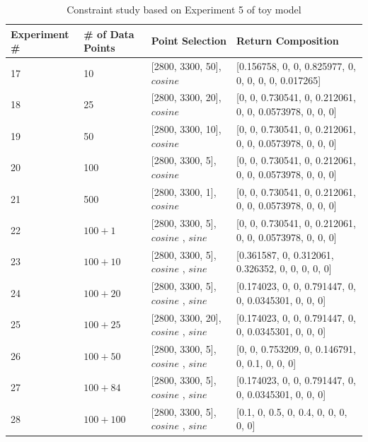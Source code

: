 \begin{table} \tiny 
\begin{center}
\begin{tabular}{| p{2cm} | p{2cm} | p{4cm}  | l |}
\hline
Experiment \# & \# of Data Points & Point Selection & Return Composition \\ \hline
17 & 10 & [2800, 3300, 50], $cosine$ & [0.156758, 0, 0, 0.825977, 0, 0, 0, 0, 0, 0.017265] \\ \hline
18 & 25 & [2800, 3300, 20], $cosine$ & [0, 0, 0.730541, 0, 0.212061, 0, 0, 0.0573978, 0, 0, 0] \\ \hline
19 & 50 & [2800, 3300, 10], $cosine$ & [0, 0, 0.730541, 0, 0.212061, 0, 0, 0.0573978, 0, 0, 0] \\ \hline
20 & 100 & [2800, 3300, 5], $cosine$ & [0, 0, 0.730541, 0, 0.212061, 0, 0, 0.0573978, 0, 0, 0] \\ \hline
21 & 500 & [2800, 3300, 1], $cosine$ & [0, 0, 0.730541, 0, 0.212061, 0, 0, 0.0573978, 0, 0, 0] \\ \hline	
22 & $100 + 1$ & [2800, 3300, 5], $cosine$ \newline [2800, 3300, 500], $sine$  & [0, 0, 0.730541, 0, 0.212061, 0, 0, 0.0573978, 0, 0, 0] \\ \hline
23 & $100 + 10$ & [2800, 3300, 5], $cosine$ \newline [2800, 3300, 50], $sine$  & [0.361587, 0, 0.312061, 0.326352, 0, 0, 0, 0, 0] \\ \hline
24 & $100 + 20$ & [2800, 3300, 5], $cosine$ \newline [2800, 3300, 25], $sine$  & [0.174023, 0, 0, 0.791447, 0, 0, 0.0345301, 0, 0, 0] \\ \hline
25 & $100 + 25$ & [2800, 3300, 20], $cosine$ \newline [2800, 3300, 20], $sine$  & [0.174023, 0, 0, 0.791447, 0, 0, 0.0345301, 0, 0, 0] \\ \hline
26 & $100 + 50$ & [2800, 3300, 5], $cosine$ \newline [2800, 3300, 10], $sine$  & [0, 0, 0.753209, 0, 0.146791, 0, 0.1, 0, 0, 0] \\ \hline
27 & $100 + 84$ & [2800, 3300, 5], $cosine$ \newline [2800, 3300, 6], $sine$  & [0.174023, 0, 0, 0.791447, 0, 0, 0.0345301, 0, 0, 0] \\ \hline
28 & $100 + 100$ & [2800, 3300, 5], $cosine$ \newline [2800, 3300, 5], $sine$  & [0.1, 0, 0.5, 0, 0.4, 0, 0, 0, 0, 0] \\ 
\hline
\end{tabular} \\
\caption{Constraint study based on Experiment 5 of toy model}\label{tab:3.5}
\end{center}
\end{table}


